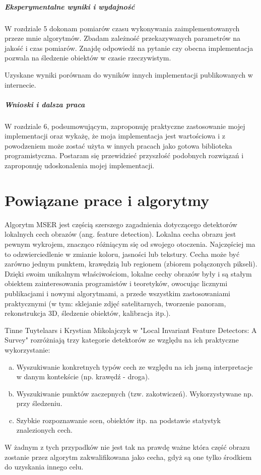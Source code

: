 \subparagraph{Eksperymentalne wyniki i wydajność}

W rozdziale 5 dokonam pomiarów czasu wykonywania zaimplementowanych przeze mnie
algorytmów. Zbadam zależność przekazywanych parametrów na jakość i czas
pomiarów. Znajdę odpowiedź na pytanie czy obecna implementacja pozwala na
śledzenie obiektów w czasie rzeczywistym.

Uzyskane wyniki porównam do wyników innych implementacji publikowanych w
internecie.

\subparagraph{Wnioski i dalsza praca}

W rozdziale 6, podsumowującym, zaproponuję praktyczne zastosowanie mojej
implementacji oraz wykażę, że moja implementacja jest wartościowa i z
powodzeniem może zostać użyta w innych pracach jako gotowa biblioteka
programistyczna. Postaram się przewidzieć przyszłość podobnych rozwiązań i
zaproponuję udoskonalenia mojej implementacji.

\section{Powiązane prace i algorytmy}

Algorytm MSER jest częścią szerszego zagadnienia dotyczącego detektorów
lokalnych cech obrazów (ang. feature detection). Lokalna cecha obrazu jest
pewnym wykrojem, znacząco różniącym się od swojego otoczenia.  Najczęściej ma
to odzwierciedlenie w zmianie koloru, jasności lub tekstury.  Cecha może być
zarówno jednym punktem, krawędzią lub regionem (zbiorem połączonych pikseli).
Dzięki swoim unikalnym właściwościom, lokalne cechy obrazów były i są stałym
obiektem zainteresowania programistów i teoretyków, owocując licznymi
publikacjami i nowymi algorytmami, a przede wszystkim zastosowaniami
praktycznymi (w tym: sklejanie zdjęć satelitarnych, tworzenie panoram,
rekonstrukcja 3D, śledzenie obiektów, kalibracja itp.).

Tinne Tuytelaars i Krystian Mikolajczyk w "Local Invariant Feature Detectors:
A Survey" \cite{survey} rozróżniają trzy kategorie detektorów ze względu na
ich praktyczne wykorzystanie: \begin{enumerate}[a)] \item Wyszukiwanie
konkretnych typów cech ze względu na ich jasną interpretacje w danym
kontekście (np. krawędź - droga). \item Wyszukiwanie punktów zaczepnych (tzw.
zakotwiczeń). Wykorzystywane np. przy śledzeniu. \item Szybkie rozpoznawanie
scen, obiektów itp. na podstawie statystyk znalezionych cech. \end{enumerate} W
żadnym z tych przypadków nie jest tak na prawdę ważne która część obrazu
zostanie przez algorytm zakwalifikowana jako cecha, gdyż są one tylko środkiem
do uzyskania innego celu.

